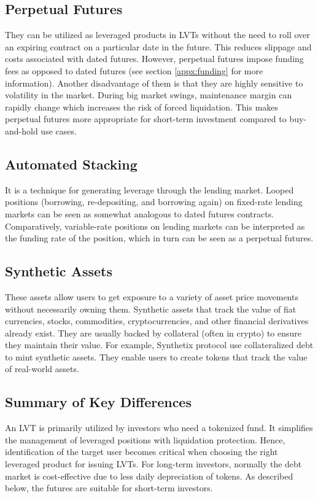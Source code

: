\subsection{Perpetual Futures}
They can be utilized as leveraged products in LVTs without the need to roll over an expiring contract on a particular date in the future. This reduces slippage and costs associated with dated futures. However, perpetual futures impose funding fees as opposed to dated futures (see section \ref{appx:funding} for more information). Another disadvantage of them is that they are highly sensitive to volatility in the market. During big market swings, maintenance margin can rapidly change which increases the risk of forced liquidation. This makes perpetual futures more appropriate for short-term investment compared to buy-and-hold use cases.

\subsection{Automated Stacking}\label{appx:looping}
It is a technique for generating leverage through the lending market. Looped positions (\ie borrowing, re-depositing, and borrowing again) on fixed-rate lending markets can be seen as somewhat analogous to dated futures contracts. Comparatively, variable-rate positions on lending markets can be interpreted as the funding rate of the position, which in turn can be seen as a perpetual futures.

\subsection{Synthetic Assets}
These assets allow users to get exposure to a variety of asset price movements without necessarily owning them. Synthetic assets that track the value of fiat currencies, stocks, commodities, cryptocurrencies, and other financial derivatives already exist. They are usually backed by collateral (often in crypto) to ensure they maintain their value. For example, Synthetix protocol use collateralized debt to mint synthetic assets. They enable users to create tokens that track the value of real-world assets.

\subsection{Summary of Key Differences}\label{appx:summary}
An LVT is primarily utilized by investors who need a tokenized fund. It simplifies the management of leveraged positions with liquidation protection. Hence, identification of the target user becomes critical when choosing the right leveraged product for issuing LVTs. For long-term investors, normally the debt market is cost-effective due to less daily depreciation of tokens. As described below, the futures are suitable for short-term investors.


